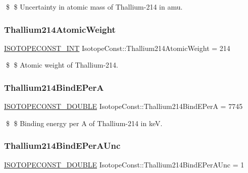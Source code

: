 \$ \$ Uncertainty in atomic mass of Thallium-\/214 in amu. \mbox{\label{group___isotope_const-_thallium-_tl214_ga4b3fe6ba5fe0a303f103ea2f43c463ea}} 
\subsubsection{\texorpdfstring{Thallium214\+Atomic\+Weight}{Thallium214AtomicWeight}}
{\footnotesize\ttfamily \mbox{\hyperlink{group___isotope_const-_macros_ga5f18360b3e99483a35c32d789e62621c}{I\+S\+O\+T\+O\+P\+E\+C\+O\+N\+S\+T\+\_\+\+I\+NT}} Isotope\+Const\+::\+Thallium214\+Atomic\+Weight = 214}

\$ \$ Atomic weight of Thallium-\/214. \mbox{\label{group___isotope_const-_thallium-_tl214_ga77754dab7a90b1d5572b1a8aa0ff7071}} 
\subsubsection{\texorpdfstring{Thallium214\+Bind\+E\+PerA}{Thallium214BindEPerA}}
{\footnotesize\ttfamily \mbox{\hyperlink{group___isotope_const-_macros_ga8f45a7272ce02c0b4c65c44636ed719a}{I\+S\+O\+T\+O\+P\+E\+C\+O\+N\+S\+T\+\_\+\+D\+O\+U\+B\+LE}} Isotope\+Const\+::\+Thallium214\+Bind\+E\+PerA = 7745}

\$ \$ Binding energy per A of Thallium-\/214 in keV. \mbox{\label{group___isotope_const-_thallium-_tl214_gafa2a2105ef8687c2aedb7fb8b2be18a1}} 
\subsubsection{\texorpdfstring{Thallium214\+Bind\+E\+Per\+A\+Unc}{Thallium214BindEPerAUnc}}
{\footnotesize\ttfamily \mbox{\hyperlink{group___isotope_const-_macros_ga8f45a7272ce02c0b4c65c44636ed719a}{I\+S\+O\+T\+O\+P\+E\+C\+O\+N\+S\+T\+\_\+\+D\+O\+U\+B\+LE}} Isotope\+Const\+::\+Thallium214\+Bind\+E\+Per\+A\+Unc = 1}

